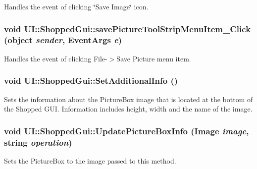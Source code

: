 \label{class_u_i_1_1_shopped_gui_a205444f0fff14792394724b4eb22601d}
Handles the event of clicking \char`\"{}Save Image\char`\"{} icon. \hypertarget{class_u_i_1_1_shopped_gui_a79d60e553769283f7b9ec8af7a9d3dc1}{
\subsubsection[{savePictureToolStripMenuItem\_\-Click}]{\setlength{\rightskip}{0pt plus 5cm}void UI::ShoppedGui::savePictureToolStripMenuItem\_\-Click (object {\em sender}, \/  EventArgs {\em e})}}
\label{class_u_i_1_1_shopped_gui_a79d60e553769283f7b9ec8af7a9d3dc1}
Handles the event of clicking File-\/$>$Save Picture menu item. \hypertarget{class_u_i_1_1_shopped_gui_a292a827437d7f2098c13bc1a735a569e}{
\subsubsection[{SetAdditionalInfo}]{\setlength{\rightskip}{0pt plus 5cm}void UI::ShoppedGui::SetAdditionalInfo ()}}
\label{class_u_i_1_1_shopped_gui_a292a827437d7f2098c13bc1a735a569e}
Sets the information about the PictureBox image that is located at the bottom of the Shopped GUI. Information includes height, width and the name of the image. \hypertarget{class_u_i_1_1_shopped_gui_a7e94e570fc92b635f64b1e540c2c86cd}{
\subsubsection[{UpdatePictureBoxInfo}]{\setlength{\rightskip}{0pt plus 5cm}void UI::ShoppedGui::UpdatePictureBoxInfo (Image {\em image}, \/  string {\em operation})}}
\label{class_u_i_1_1_shopped_gui_a7e94e570fc92b635f64b1e540c2c86cd}
Sets the PictureBox to the image passed to this method. 
